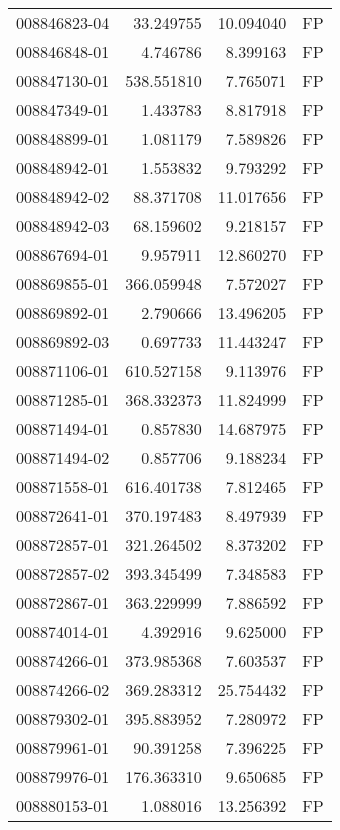 \begin{tabular}{lrrl}
008846823-04 &   33.249755 &      10.094040 &   FP \\
008846848-01 &    4.746786 &       8.399163 &   FP \\
008847130-01 &  538.551810 &       7.765071 &   FP \\
008847349-01 &    1.433783 &       8.817918 &   FP \\
008848899-01 &    1.081179 &       7.589826 &   FP \\
008848942-01 &    1.553832 &       9.793292 &   FP \\
008848942-02 &   88.371708 &      11.017656 &   FP \\
008848942-03 &   68.159602 &       9.218157 &   FP \\
008867694-01 &    9.957911 &      12.860270 &   FP \\
008869855-01 &  366.059948 &       7.572027 &   FP \\
008869892-01 &    2.790666 &      13.496205 &   FP \\
008869892-03 &    0.697733 &      11.443247 &   FP \\
008871106-01 &  610.527158 &       9.113976 &   FP \\
008871285-01 &  368.332373 &      11.824999 &   FP \\
008871494-01 &    0.857830 &      14.687975 &   FP \\
008871494-02 &    0.857706 &       9.188234 &   FP \\
008871558-01 &  616.401738 &       7.812465 &   FP \\
008872641-01 &  370.197483 &       8.497939 &   FP \\
008872857-01 &  321.264502 &       8.373202 &   FP \\
008872857-02 &  393.345499 &       7.348583 &   FP \\
008872867-01 &  363.229999 &       7.886592 &   FP \\
008874014-01 &    4.392916 &       9.625000 &   FP \\
008874266-01 &  373.985368 &       7.603537 &   FP \\
008874266-02 &  369.283312 &      25.754432 &   FP \\
008879302-01 &  395.883952 &       7.280972 &   FP \\
008879961-01 &   90.391258 &       7.396225 &   FP \\
008879976-01 &  176.363310 &       9.650685 &   FP \\
008880153-01 &    1.088016 &      13.256392 &   FP \\

\end{tabular}
